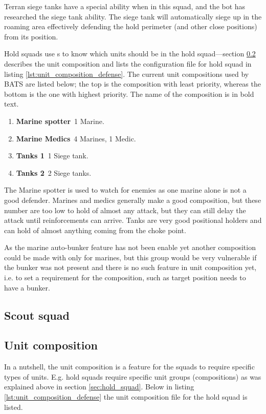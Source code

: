Terran siege tanks have a special ability when in this squad, and the bot has researched the siege tank ability. The siege tank will automatically siege up in the roaming area effectively defending the hold perimeter (and other close positions) from its position.

Hold squads use s to know which units should be in the hold squad—section \ref{sec:unit_composition} describes the unit composition and lists the configuration file for hold squad in listing \ref{lst:unit_composition_defense}. The current unit compositions used by BATS are listed below; the top is the composition with least priority, whereas the bottom is the one with highest priority. The name of the composition is in bold text.

\begin{enumerate}
	\item \textbf{Marine spotter}~1 Marine.
	\item \textbf{Marine Medics}~4 Marines, 1 Medic.
	\item \textbf{Tanks 1}~1 Siege tank.
	\item \textbf{Tanks 2}~2 Siege tanks.
\end{enumerate}
The Marine spotter is used to watch for enemies as one marine alone is not a good defender. Marines and medics generally make a good composition, but these number are too low to hold of almost any attack, but they can still delay the attack until reinforcements can arrive. Tanks are very good positional holders and can hold of almost anything coming from the choke point. 

As the marine auto-bunker feature has not been enable yet another composition could be made with only for marines, but this group would be very vulnerable if the bunker was not present and there is no such feature in unit composition yet, i.e. to set a requirement for the composition, such as target position needs to have a bunker.

\subsection{Scout squad}
\label{sec:scout_squad}

\subsection{Unit composition}
\label{sec:unit_composition}
In a nutshell, the unit composition is a feature for the squads to require specific types of units. E.g. hold squads require specific unit groups (compositions) as was explained above in section \ref{sec:hold_squad}. Below in listing \ref{lst:unit_composition_defense} the unit composition file for the hold squad is listed.

